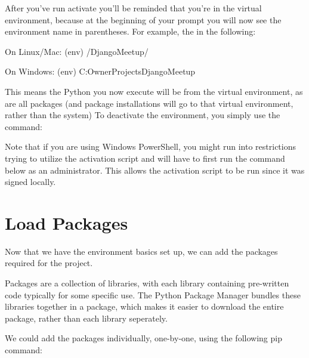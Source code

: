 \documentclass[letterpaper,10pt,english]{sphinxmanual}
\begin{document}
After you’ve run activate you’ll be reminded that you’re in the virtual environment, because at the beginning of your prompt you will now see the environment name in parentheses.  For example, the  in the following:

\begin{sphinxVerbatim}[commandchars=\\\{\}]
On Linux/Mac:
(env) \PYGZti{}/DjangoMeetup/ \PYGZdl{}

On Windows:
(env) C:\PYGZbs{}Owner\PYGZbs{}Projects\PYGZbs{}DjangoMeetup \PYGZgt{}
\end{sphinxVerbatim}

This means the Python you now execute will be from the virtual environment, as are all packages (and package installations will go to that virtual environment, rather than the system)
To deactivate the environment, you simply use the command:

\begin{sphinxVerbatim}[commandchars=\\\{\}]
\end{sphinxVerbatim}

Note that if you are using Windows PowerShell, you might run into restrictions trying to utilize the activation script and will have to first run the command below as an administrator. This allows the activation script to be run since it was signed locally.

\begin{sphinxVerbatim}[commandchars=\\\{\}]
 
\end{sphinxVerbatim}


\section{Load Packages}
\label{\detokenize{guide/04_packages:load-packages}}\label{\detokenize{guide/04_packages::doc}}
Now that we have the environment basics set up, we can add the packages required for the project.

Packages are a collection of libraries, with each library containing pre-written code typically for some specific use.  The Python Package Manager bundles these libraries together in a package, which makes it easier to download the entire package, rather than each library seperately.

We could add the packages individually, one-by-one, using the following pip command:
\end{document}
